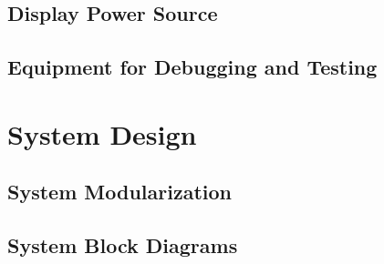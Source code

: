 \documentclass[class=report,11pt,crop=false]{standalone}
\begin{document}
	\subsection{Display Power Source}
	
	\subsection{Equipment for Debugging and Testing}
		
	\section{System Design}
	
	\subsection{System Modularization}
	
	\subsection{System Block Diagrams}
	\ifstandalone
	
	\printnoidxglossary[type=\acronymtype,nonumberlist]
	\fi
\end{document}
